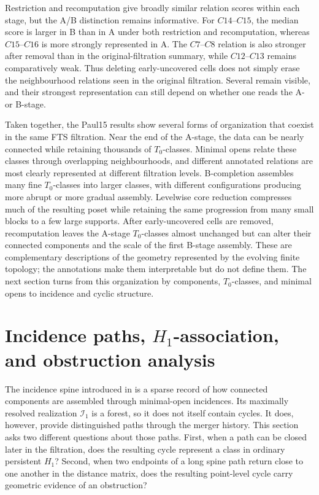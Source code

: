 \documentclass[a4paper,11pt]{article}
\theoremstyle{definition}
\theoremstyle{remark}
\begin{document}
Restriction and recomputation give broadly similar relation scores within each stage, but the A/B distinction remains informative. For $C14$–$C15$, the median score is larger in B than in A under both restriction and recomputation, whereas $C15$–$C16$ is more strongly represented in A. The $C7$–$C8$ relation is also stronger after removal than in the original-filtration summary, while $C12$–$C13$ remains comparatively weak. Thus deleting early-uncovered cells does not simply erase the neighbourhood relations seen in the original filtration. Several remain visible, and their strongest representation can still depend on whether one reads the A- or B-stage.

Taken together, the Paul15 results show several forms of organization that coexist in the same FTS filtration. Near the end of the A-stage, the data can be nearly connected while retaining thousands of $T_0$-classes. Minimal opens relate these classes through overlapping neighbourhoods, and different annotated relations are most clearly represented at different filtration levels. B-completion assembles many fine $T_0$-classes into larger classes, with different configurations producing more abrupt or more gradual assembly. Levelwise core reduction compresses much of the resulting poset while retaining the same progression from many small blocks to a few large supports. After early-uncovered cells are removed, recomputation leaves the A-stage $T_0$-classes almost unchanged but can alter their connected components and the scale of the first B-stage assembly. These are complementary descriptions of the geometry represented by the evolving finite topology; the annotations make them interpretable but do not define them. The next section turns from this organization by components, $T_0$-classes, and minimal opens to incidence and cyclic structure.



\section{Incidence paths, $H_1$-association, and obstruction analysis}
\label{sec:incidence-obstruction}

The incidence spine introduced in  is a sparse record of how connected components are assembled through minimal-open incidences. Its maximally resolved realization $\mathcal I_1$ is a forest, so it does not itself contain cycles. It does, however, provide distinguished paths through the merger history. This section asks two different questions about those paths. First, when a path can be closed later in the filtration, does the resulting cycle represent a class in ordinary persistent $H_1$? Second, when two endpoints of a long spine path return close to one another in the distance matrix, does the resulting point-level cycle carry geometric evidence of an obstruction?
\end{document}
